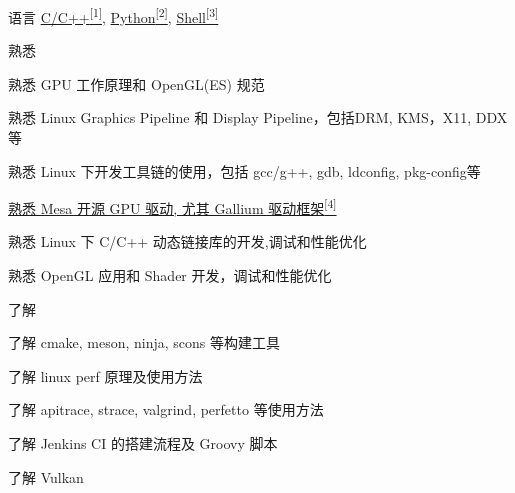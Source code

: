
\begin{cvskills}
  \cvskill
    {语言} %
    {\hyperlink{cpp-proj}{C/C++\textsuperscript{[1]}}, \hyperlink{python-proj}{Python\textsuperscript{[2]}}, \hyperlink{shell-proj}{Shell\textsuperscript{[3]}}} %
\end{cvskills}

\begin{cventries}
  \cventry
    {} %
    {熟悉} %
    {} %
    {} %
    {
      \begin{cvitems} %
        \item {熟悉 GPU 工作原理和 OpenGL(ES) 规范}
        \item {熟悉 Linux Graphics Pipeline 和 Display Pipeline，包括DRM, KMS，X11, DDX等}
        \item {熟悉 Linux 下开发工具链的使用，包括 gcc/g++, gdb, ldconfig, pkg-config等}
        \item {\hyperlink{mesa-mr}{熟悉 Mesa 开源 GPU 驱动, 尤其 Gallium 驱动框架\textsuperscript{[4]}}}
        \item {熟悉 Linux 下 C/C++ 动态链接库的开发,调试和性能优化}
        \item {熟悉 OpenGL 应用和 Shader 开发，调试和性能优化}
      \end{cvitems}
    }
  \cventry
    {} %
    {了解} %
    {} %
    {} %
    {
      \begin{cvitems} %
        \item {了解 cmake, meson, ninja, scons 等构建工具}
        \item {了解 linux perf 原理及使用方法}
        \item {了解 apitrace, strace, valgrind, perfetto 等使用方法}
        \item {了解 Jenkins CI 的搭建流程及 Groovy 脚本}
        \item {了解 Vulkan}
      \end{cvitems}
    }
\end{cventries}
